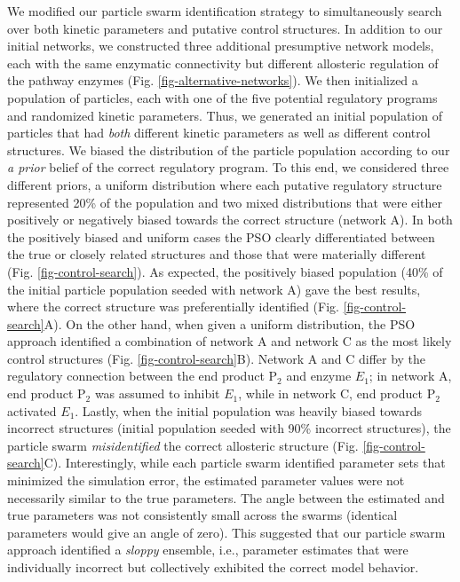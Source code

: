 \documentclass[processes,article,accept,moreauthors,pdftex,12pt,a4paper]{mdpi}
\begin{document}
We modified our particle swarm identification strategy to simultaneously search over both kinetic parameters and putative control structures. 
In addition to our initial networks, we constructed three additional presumptive network models, each with the same enzymatic connectivity but different allosteric regulation of the pathway enzymes (Fig. \ref{fig-alternative-networks}). 
We then initialized a population of particles, each with one of the five potential regulatory programs and randomized kinetic parameters. 
Thus, we generated an initial population of particles that had \textit{both} different kinetic parameters as well as different control structures. 
We biased the distribution of the particle population according to our \textit{a prior} belief of the correct regulatory program. 
To this end, we considered three different priors, a uniform distribution where each putative regulatory structure represented 20\% of the population and two mixed distributions that were either positively or negatively biased towards the correct structure (network A). 
In both the positively biased and uniform cases the PSO clearly differentiated between the true or closely related structures and those that were materially different (Fig. \ref{fig-control-search}). 
As expected, the positively biased population (40\% of the initial particle population seeded with network A) gave the best results, where the correct structure was preferentially identified (Fig. \ref{fig-control-search}A). 
On the other hand, when given a uniform distribution, the PSO approach identified a combination of network A and network C as the most likely control structures (Fig. \ref{fig-control-search}B). 
Network A and C differ by the regulatory connection between the end product P$_2$ and enzyme $E_{1}$; in network A, end product P$_{2}$ was assumed to inhibit $E_{1}$, while in network C, end product P$_{2}$ activated $E_{1}$.  
Lastly, when the initial population was heavily biased towards incorrect structures (initial population seeded with 90\% incorrect structures), the particle swarm \textit{misidentified} the correct allosteric structure (Fig. \ref{fig-control-search}C). Interestingly, while each particle swarm identified parameter sets that minimized the simulation error, the estimated parameter values were not necessarily similar to the true parameters. 
The angle between the estimated and true parameters was not consistently small across the swarms (identical parameters would give an angle of zero). 
This suggested that our particle swarm approach identified a \textit{sloppy} ensemble, i.e., parameter estimates that were individually incorrect but collectively exhibited the correct model behavior.  
\end{document}
